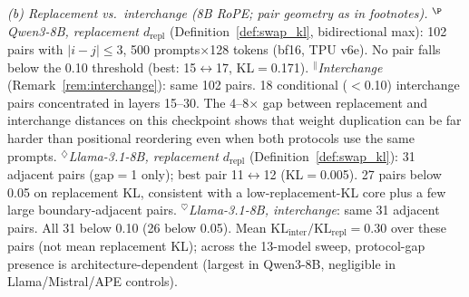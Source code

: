 \documentclass{article}
\newenvironment{tabhere}{%
  \par\medskip
  \begin{center}
}{%
  \end{center}
  \medskip
}
\begin{document}
\begin{tabhere}
\vspace{0.75em}
\noindent\textit{(b) Replacement vs.\ interchange (8B RoPE; pair geometry as in footnotes).}
%
\vspace{4pt}
\small{$^\P$\emph{Qwen3-8B, replacement $d_{\text{repl}}$} (Definition~\ref{def:swap_kl}, bidirectional max): 102 pairs with $|i{-}j|{\leq}3$, 500 prompts$\times$128 tokens (bf16, TPU v6e). No pair falls below the 0.10 threshold (best: 15$\leftrightarrow$17, KL$=$0.171). $^\|$\emph{Interchange} (Remark~\ref{rem:interchange}): same 102 pairs. 18 conditional ($<$0.10) interchange pairs concentrated in layers 15--30. The 4--8$\times$ gap between replacement and interchange distances on this checkpoint shows that weight duplication can be far harder than positional reordering even when both protocols use the same prompts.
$^\diamondsuit$\emph{Llama-3.1-8B, replacement $d_{\text{repl}}$} (Definition~\ref{def:swap_kl}): 31 adjacent pairs (gap$=$1 only); best pair 11$\leftrightarrow$12 (KL$=$0.005). 27 pairs below 0.05 on replacement KL, consistent with a low-replacement-KL core plus a few large boundary-adjacent pairs.
$^\heartsuit$\emph{Llama-3.1-8B, interchange}: same 31 adjacent pairs. All 31 below 0.10 (26 below 0.05). Mean $\mathrm{KL}_{\mathrm{inter}}/\mathrm{KL}_{\mathrm{repl}}=0.30$ over these pairs (not mean replacement KL); across the 13-model sweep, protocol-gap presence is architecture-dependent (largest in Qwen3-8B, negligible in Llama/Mistral/APE controls).}
\label{tab:scaling}
\end{tabhere}
\end{document}
